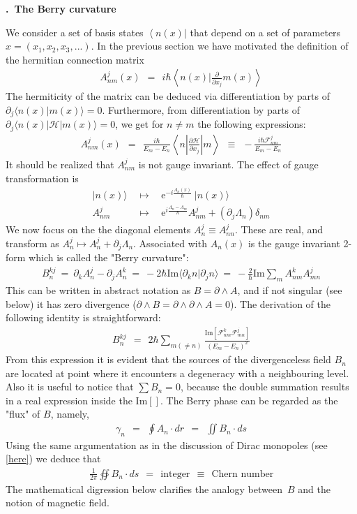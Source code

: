 \documentclass[onecolumn,fleqn, 11pt]{revtex4}
\newcommand{\im}{\mathrm{Im}}
\newcommand{\eexp}{\mathrm{e}^}
\newcommand{\bra}[1]{\left\langle #1 \right|}
\newcommand{\beq}{\begin{eqnarray}}
\newcommand{\eeq}{\end{eqnarray}}
\renewcommand{\thesubsection}{\arabic{subsection}}
\renewcommand{\thesubsubsection}{\arabic{subsubsection}}
\newcommand{\sheadC}[1]
{
\addtocounter{subsubsection}{1}
\vspace{5mm}
{\bf \thesubsection.\thesubsubsection \ #1}  
\nopagebreak
\phantomsection
}
\begin{document}
\sheadC{The Berry curvature}
 
We consider a set of basis states $\bra{n(x)}$ that depend 
on a set of parameters ${x=(x_1,x_2,x_3,...)}$.    
In the previous section we have motivated the definition
of the hermitian connection matrix 
\beq
A^{j}_{nm}(x) \ \ = \ \ 
i\hbar \left\langle n(x) \Big|
\frac{\partial}{\partial x_j} m(x)\right\rangle
\eeq
The hermiticity  of the matrix can be deduced via differentiation by parts 
of $\partial_j \langle n(x)|m(x) \rangle  = 0$.
Furthermore, from differentiation by parts of $\partial_j \langle n(x)|{\mathcal{H}}|m(x) \rangle  = 0$,
we get for $n\ne m$ the following expressions:
\beq
A^{j}_{nm}(x) \ \ = \ \ \frac{i\hbar}{E_m - E_n}
\left\langle n \left|\frac{\partial {\mathcal{H}}}{\partial x_j}\right|m\right\rangle
\ \ \equiv \ \ -\frac{i\hbar \mathcal{F}^j_{nm}}{E_m - E_n}
\eeq
It should be realized that $A^{j}_{nm}$ is not gauge invariant.  
The effect of gauge transformation is
\beq
|n(x)\rangle \ & \ \mapsto \ & \ \eexp{-i\frac{\Lambda_n(x)}{\hbar}} \ |n(x)\rangle 
\\ \nonumber
A^{j}_{nm} \ & \ \mapsto \ & \
\eexp{i\frac{\Lambda_n{-}\Lambda_m}{\hbar}} A^{j}_{nm}
+ (\partial_j \Lambda_n)\delta_{nm} \nonumber
\eeq
We now focus on the the diagonal elements $A^{j}_{n} \equiv A^{j}_{nn}$. 
These are real, and transform as $A^{j}_{n} \mapsto A^{j}_{n} + \partial_j \Lambda_n$.
Associated with $A_n(x)$ is the gauge invariant 2-form 
which is called the "Berry curvature": 
\beq
B^{kj}_{n} 
\ = \ 
\partial_k A^{j}_{n} - \partial_j A^{k}_{n} 
\ = \ -2\hbar \im\langle\partial_k n|\partial_j n\rangle 
\ = \ -\frac{2}{\hbar}\im \sum_{m}
A^{k}_{nm} A^{j}_{mn}
\eeq
This can be written in abstract notation as $B=\partial \wedge A$, 
and if not singular (see below) it has zero divergence 
(${\partial \wedge B=  \partial \wedge \partial \wedge A = 0}$).  
The derivation of the following identity is straightforward: 
\beq
B^{kj}_{n} \ \ = \ \ 2\hbar \sum_{m(\ne n)}
\frac{\im\left[
\mathcal{F}^k_{nm}{\mathcal{F}}^j_{mn}\right]}
{(E_m-E_n)^2}
\eeq
From this expression it is evident that the sources of the 
divergenceless field $B_n$ are located at point where it 
encounters a degeneracy with a neighbouring level.  
Also it is useful to notice that ${\sum B_n =0}$, 
because the double summation results in a real expression inside the $\im[]$.   
The Berry phase can be regarded as the "flux" of $B$, namely, 
\beq
\gamma_n \ \ = \ \ \oint A_n \cdot dr  \ \ = \ \ \iint B_n \cdot ds
\eeq
Using the same argumentation as in the discussion of Dirac monopoles (see \hyperref[sMonopoles]{[here]})
we deduce that
\beq
\frac{1}{2\pi}\oiint B_n \cdot ds \ \ = \ \ \text{integer} \ \ \equiv \ \ \text{Chern number} 
\eeq
The mathematical digression below clarifies the analogy between~$B$ 
and the notion of magnetic field.
\end{document}
